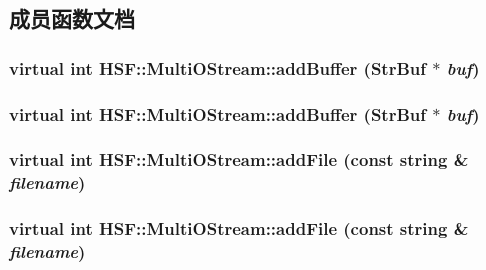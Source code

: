 \subsection{成员函数文档}
\hypertarget{classHSF_1_1MultiOStream_a0fea8b810751922bf4b67b814b31b737}{
\subsubsection[{addBuffer}]{\setlength{\rightskip}{0pt plus 5cm}virtual int HSF::MultiOStream::addBuffer ({\bf StrBuf} $\ast$ {\em buf})}}
\label{classHSF_1_1MultiOStream_a0fea8b810751922bf4b67b814b31b737}
\hypertarget{classHSF_1_1MultiOStream_a0fea8b810751922bf4b67b814b31b737}{
\subsubsection[{addBuffer}]{\setlength{\rightskip}{0pt plus 5cm}virtual int HSF::MultiOStream::addBuffer ({\bf StrBuf} $\ast$ {\em buf})}}
\label{classHSF_1_1MultiOStream_a0fea8b810751922bf4b67b814b31b737}
\hypertarget{classHSF_1_1MultiOStream_ad43365fb905b031fcbe0e9618daf8d28}{
\subsubsection[{addFile}]{\setlength{\rightskip}{0pt plus 5cm}virtual int HSF::MultiOStream::addFile (const string \& {\em filename})}}
\label{classHSF_1_1MultiOStream_ad43365fb905b031fcbe0e9618daf8d28}
\hypertarget{classHSF_1_1MultiOStream_ad43365fb905b031fcbe0e9618daf8d28}{
\subsubsection[{addFile}]{\setlength{\rightskip}{0pt plus 5cm}virtual int HSF::MultiOStream::addFile (const string \& {\em filename})}}
